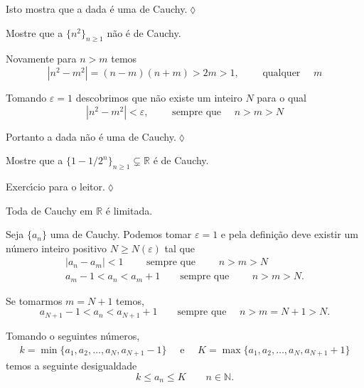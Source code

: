 Isto mostra que a \seq dada \'{e} uma \seq de Cauchy.\hfill \(\lozenge\)

\begin{exer}
Mostre que a \seq $\{n^2\}_{n\geq 1}$ n\~{a}o \'{e} de Cauchy.
\end{exer}

\solo Novamente para $n>m$ temos
\begin{equation*}
  |n^2-m^2|=(n-m)(n+m)>2m>1, \qquad \text{ qualquer }\quad m
\end{equation*}

Tomando $\varepsilon =1$ descobrimos que n\~{a}o existe um inteiro $N$
para o qual
\begin{equation*}
  |n^2-m^2|<\varepsilon, \qquad \text{ sempre que }\quad n>m>N
\end{equation*}

Portanto a \seq dada n\~{a}o \'{e} uma \seq de Cauchy.\hfill \(\lozenge\)

\begin{exer}
Mostre que a \seq $\{1-1/2^n\}_{n\geq 1}\subsetneq \mathbb{R}$ \'{e}
de Cauchy.
\end{exer}

\solo Exerc\'{\i}cio para o leitor.\hfill \(\lozenge\)

\begin{fteo}\label{cau3}
Toda \seq de Cauchy em $\mathbb{R}$ \'{e} limitada.
\end{fteo}

\prova Seja $\{a_n\}$ uma \seq de Cauchy. Podemos tomar
$\varepsilon=1$ e pela defini\c{c}\~{a}o deve existir um n\'{u}mero inteiro positivo
$N\geq N(\varepsilon)$ tal que
\begin{align*}
    |a_n-a_m|<1\qquad \text{ sempre que }\qquad n>m> N\\[2ex]
    a_m-1<a_n<a_m+1\qquad \text{sempre que }\qquad n>m>N.
\end{align*}

Se tomarmos $m=N+1$ temos,
\begin{equation*}
a_{N+1}-1<a_n<a_{N+1}+1\qquad \text{sempre que }\quad n>m=N+1>N.
\end{equation*}

Tomando o seguintes n\'{u}meros,
\begin{align*}
    k=\min\{a_1,a_2,\ldots, a_{N}, a_{N+1}-1\}\quad \text{ e }\quad
    K=\max\{a_1,a_2,\ldots, a_{N}, a_{N+1}+1  \}
\end{align*}
temos a seguinte desigualdade
\begin{equation*}
    k\leq a_n\leq K\qquad n\in \mathbb{N}.
\end{equation*}

